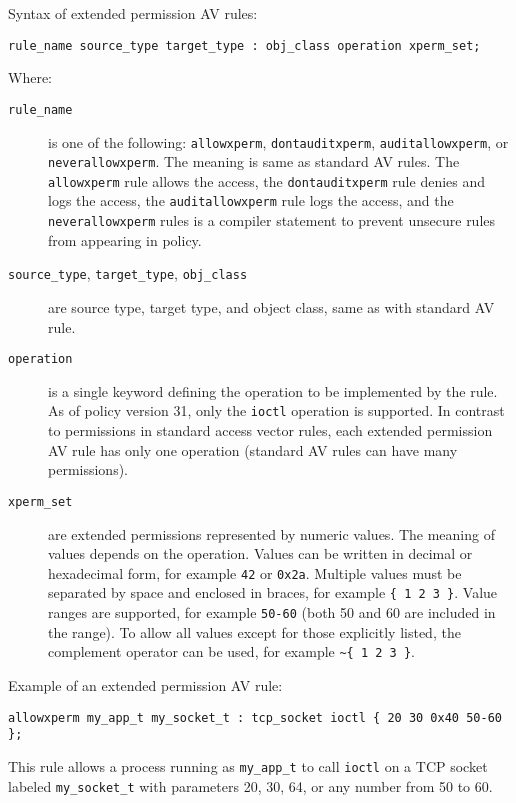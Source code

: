 Syntax of extended permission AV rules\cite{xpermrules}:
\begin{lstlisting}[language=te]
rule_name source_type target_type : obj_class operation xperm_set;
\end{lstlisting}
Where:
\begin{description}
    \item [\texttt{rule\_name}] is one of the following: \texttt{allowxperm},
        \texttt{dontauditxperm}, \texttt{auditallowxperm}, or
        \texttt{neverallowxperm}. The meaning is same as standard AV rules. The
        \texttt{allowxperm} rule allows the access, the \texttt{dontauditxperm}
        rule denies and logs the access, the \texttt{auditallowxperm} rule logs
        the access, and the \texttt{neverallowxperm} rules is a compiler
        statement to prevent unsecure rules from appearing in policy.
    \item [\texttt{source\_type}, \texttt{target\_type}, \texttt{obj\_class}]
        are source type, target type, and object class, same as with standard AV
        rule.
    \item [\texttt{operation}] is a single keyword defining the operation to be
        implemented by the rule. As of policy version 31, only the
        \texttt{ioctl} operation is supported. In contrast to permissions in
        standard access vector rules, each extended permission AV rule has only
        one operation (standard AV rules can have many permissions).
    \item [\texttt{xperm\_set}] are extended permissions represented by numeric
        values. The meaning of values depends on the operation. Values can be
        written in decimal or hexadecimal form, for example \texttt{42} or
        \texttt{0x2a}. Multiple values must be separated by space and enclosed
        in braces, for example \texttt{\{ 1 2 3 \}}. Value ranges are supported,
        for example \texttt{50-60} (both 50 and 60 are included in the range).
        To allow all values except for those explicitly listed, the complement
        operator can be used, for example \texttt{\textasciitilde \{ 1 2 3 \}}.
\end{description}

Example of an extended permission AV rule:
\begin{lstlisting}[language=te]
allowxperm my_app_t my_socket_t : tcp_socket ioctl { 20 30 0x40 50-60 };
\end{lstlisting}
This rule allows a process running as \texttt{my\_app\_t} to call \texttt{ioctl}
on a TCP socket labeled \texttt{my\_socket\_t} with parameters 20, 30, 64, or
any number from 50 to 60.

